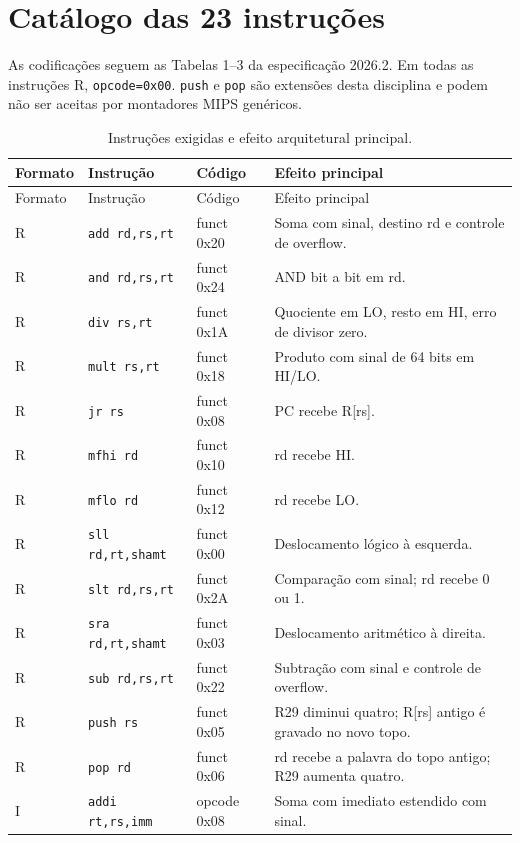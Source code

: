\section{Catálogo das 23 instruções}\label{ap:catalogo}

As codificações seguem as Tabelas 1--3 da especificação 2026.2. Em todas as instruções R, \texttt{opcode=0x00}. \texttt{push} e \texttt{pop} são extensões desta disciplina e podem não ser aceitas por montadores MIPS genéricos.

\small
\begin{longtable}{@{}p{1.42cm}p{3.45cm}p{2.25cm}p{6.93cm}@{}}
\caption{Instruções exigidas e efeito arquitetural principal.}\label{tab:catalogo}\\
\toprule Formato & Instrução & Código & Efeito principal \\\midrule
\endfirsthead
\toprule Formato & Instrução & Código & Efeito principal \\\midrule
\endhead
\bottomrule
\endfoot
R & \texttt{add rd,rs,rt} & funct 0x20 & Soma com sinal, destino rd e controle de overflow. \\
R & \texttt{and rd,rs,rt} & funct 0x24 & AND bit a bit em rd. \\
R & \texttt{div rs,rt} & funct 0x1A & Quociente em LO, resto em HI, erro de divisor zero. \\
R & \texttt{mult rs,rt} & funct 0x18 & Produto com sinal de 64 bits em HI/LO. \\
R & \texttt{jr rs} & funct 0x08 & PC recebe R[rs]. \\
R & \texttt{mfhi rd} & funct 0x10 & rd recebe HI. \\
R & \texttt{mflo rd} & funct 0x12 & rd recebe LO. \\
R & \texttt{sll rd,rt,shamt} & funct 0x00 & Deslocamento lógico à esquerda. \\
R & \texttt{slt rd,rs,rt} & funct 0x2A & Comparação com sinal; rd recebe 0 ou 1. \\
R & \texttt{sra rd,rt,shamt} & funct 0x03 & Deslocamento aritmético à direita. \\
R & \texttt{sub rd,rs,rt} & funct 0x22 & Subtração com sinal e controle de overflow. \\
R & \texttt{push rs} & funct 0x05 & R29 diminui quatro; R[rs] antigo é gravado no novo topo. \\
R & \texttt{pop rd} & funct 0x06 & rd recebe a palavra do topo antigo; R29 aumenta quatro. \\
I & \texttt{addi rt,rs,imm} & opcode 0x08 & Soma com imediato estendido com sinal. \\

\end{longtable}
